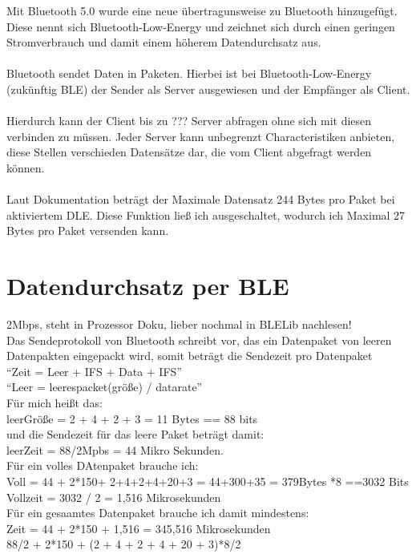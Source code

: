 Mit Bluetooth 5.0 wurde eine neue übertragunsweise zu 
Bluetooth hinzugefügt. Diese nennt sich Bluetooth-Low-Energy und zeichnet
sich durch einen geringen Stromverbrauch und damit einem höherem 
Datendurchsatz aus. \\
\\
Bluetooth sendet Daten in Paketen. Hierbei ist bei Bluetooth-Low-Energy
(zukünftig BLE) der Sender als Server ausgewiesen und der Empfänger als Client.\\
\\
Hierdurch kann der Client bis zu ??? Server abfragen ohne sich mit diesen 
verbinden zu müssen. Jeder Server kann unbegrenzt Characteristiken anbieten,
diese Stellen verschieden Datensätze dar, die vom Client abgefragt werden können.\\
\\
Laut Dokumentation beträgt der Maximale Datensatz 244 Bytes pro Paket bei 
aktiviertem DLE. Diese Funktion ließ ich ausgeschaltet, wodurch ich Maximal
27 Bytes pro Paket versenden kann. \\

\section{Datendurchsatz per BLE}
2Mbps, steht in Prozessor Doku, lieber nochmal in BLELib nachlesen!
\\
Das Sendeprotokoll von Bluetooth schreibt vor, das ein Datenpaket von
leeren Datenpakten eingepackt wird, somit beträgt die Sendezeit pro 
Datenpaket 
\\
``Zeit = Leer + IFS + Data + IFS''
\\
``Leer = leerespacket(größe) / datarate''
\\
Für mich heißt das:\\
leerGröße = 2 + 4 + 2 + 3 = 11 Bytes == 88 bits
\\
und die Sendezeit für das leere Paket beträgt damit:
\\
leerZeit = 88/2Mpbs = 44 Mikro Sekunden.
\\
Für ein volles DAtenpaket brauche ich:\\
Voll = 44 + 2*150+ 2+4+2+4+20+3 = 44+300+35 = 379Bytes *8 ==3032 Bits\\
Vollzeit = 3032 / 2 = 1,516 Mikrosekunden
\\
Für ein gesaamtes Datenpaket brauche ich damit mindestens:\\
Zeit = 44 + 2*150 + 1,516 = 345,516 Mikrosekunden
\\
88/2 + 2*150 + (2 + 4 + 2 + 4 + 20 + 3)*8/2


